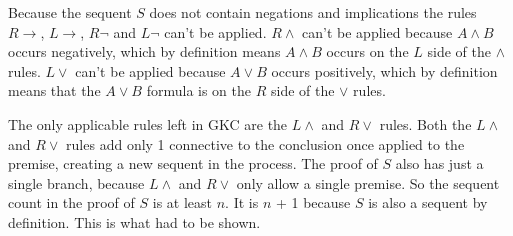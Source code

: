 \documentclass{article}
\begin{document}
Because the sequent $S$ does not contain negations and implications the rules
$R\to$, $L\to$, $R\neg$ and $L\neg$ can't be applied.
$R\wedge$ can't be applied because $A \wedge B$ occurs negatively,
which by definition means $A \wedge B$ occurs on the $L$ side of the
$\wedge$ rules.
$L\vee$ can't be
applied because $A \vee B$ occurs positively, which by definition means
that the $A \vee B$ formula is on the $R$ side of the $\vee$ rules.

The only applicable rules left in GKC are the $L\wedge$ and $R\vee$ rules.
Both the $L\wedge$ and $R\vee$ rules add only 1 connective to the conclusion
once applied to the premise, creating a new sequent in the process. The proof
of $S$ also has just a single branch, because $L\wedge$ and $R\vee$ only allow
a single premise.
So the
sequent count in the proof of $S$ is at least $n$. It is $n$ + 1 because $S$ is also
a sequent by definition. This is what had to be shown.
\end{document}
